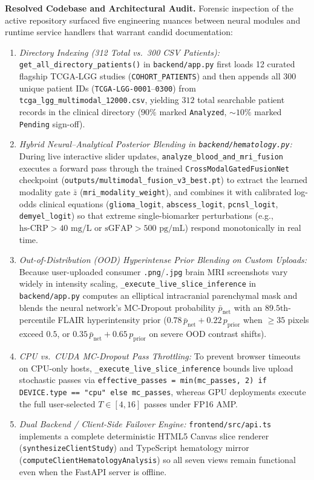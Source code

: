 \documentclass[conference]{IEEEtran}
\begin{document}
\textbf{Resolved Codebase and Architectural Audit.} Forensic inspection of the active repository surfaced five engineering nuances between neural modules and runtime service handlers that warrant candid documentation:
\begin{enumerate}
    \item \textit{Directory Indexing (312 Total vs.\ 300 CSV Patients):} \texttt{get\_all\_directory\_patients()} in \texttt{backend/app.py} first loads 12 curated flagship TCGA-LGG studies (\texttt{COHORT\_PATIENTS}) and then appends all 300 unique patient IDs (\texttt{TCGA-LGG-0001}--\texttt{0300}) from \texttt{tcga\_lgg\_multimodal\_12000.csv}, yielding $312$ total searchable patient records in the clinical directory ($90\%$ marked \texttt{Analyzed}, $\sim 10\%$ marked \texttt{Pending} sign-off).
    \item \textit{Hybrid Neural--Analytical Posterior Blending in \texttt{backend/hematology.py}:} During live interactive slider updates, \texttt{analyze\_blood\_and\_mri\_fusion} executes a forward pass through the trained \texttt{CrossModalGatedFusionNet} checkpoint (\texttt{outputs/multimodal\_fusion\_v3\_best.pt}) to extract the learned modality gate $\bar{z}$ (\texttt{mri\_modality\_weight}), and combines it with calibrated log-odds clinical equations (\texttt{glioma\_logit}, \texttt{abscess\_logit}, \texttt{pcnsl\_logit}, \texttt{demyel\_logit}) so that extreme single-biomarker perturbations (e.g., $\text{hs-CRP} > 40\text{ mg/L}$ or $\text{sGFAP} > 500\text{ pg/mL}$) respond monotonically in real time.
    \item \textit{Out-of-Distribution (OOD) Hyperintense Prior Blending on Custom Uploads:} Because user-uploaded consumer \texttt{.png}/\texttt{.jpg} brain MRI screenshots vary widely in intensity scaling, \texttt{\_execute\_live\_slice\_inference} in \texttt{backend/app.py} computes an elliptical intracranial parenchymal mask and blends the neural network's MC-Dropout probability $\bar{p}_{\text{net}}$ with an $89.5\text{th}$-percentile FLAIR hyperintensity prior ($0.78\,\bar{p}_{\text{net}} + 0.22\,p_{\text{prior}}$ when $\ge 35$ pixels exceed $0.5$, or $0.35\,\bar{p}_{\text{net}} + 0.65\,p_{\text{prior}}$ on severe OOD contrast shifts).
    \item \textit{CPU vs.\ CUDA MC-Dropout Pass Throttling:} To prevent browser timeouts on CPU-only hosts, \texttt{\_execute\_live\_slice\_inference} bounds live upload stochastic passes via \texttt{effective\_passes = min(mc\_passes, 2) if DEVICE.type == "cpu" else mc\_passes}, whereas GPU deployments execute the full user-selected $T \in [4, 16]$ passes under FP16 AMP.
    \item \textit{Dual Backend / Client-Side Failover Engine:} \texttt{frontend/src/api.ts} implements a complete deterministic HTML5 Canvas slice renderer (\texttt{synthesizeClientStudy}) and TypeScript hematology mirror (\texttt{computeClientHematologyAnalysis}) so all seven views remain functional even when the FastAPI server is offline.
\end{enumerate}
\end{document}
